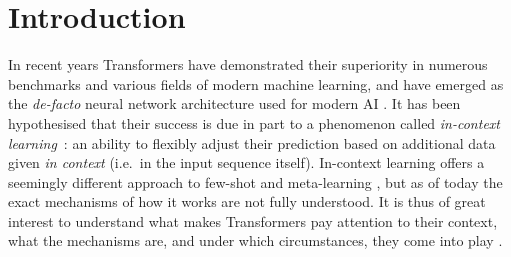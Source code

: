 \documentclass{article}
\theoremstyle{plain}
\theoremstyle{definition}
\theoremstyle{remark}
\begin{document}

\section{Introduction}

In recent years Transformers \citep[TFs;][]{transformers} have demonstrated their superiority in numerous benchmarks and various fields of modern machine learning,
and have emerged as the \textit{de-facto} neural network architecture used for modern AI \citep{transformers_vision, NEURIPS2019_9d63484a, https://doi.org/10.48550/arxiv.2005.12872, convormer}. It has been hypothesised that their success is due in part to a phenomenon called \textit{in-context learning}~\citep{transformers_few_shot,pre_train_prompt}: an ability to flexibly adjust their prediction based on additional data given \emph{in context} (i.e.\ in the input sequence itself). In-context learning offers a seemingly different approach to few-shot and meta-learning \citep{transformers_few_shot}, but as of today the exact mechanisms of how it works are not fully understood.
It is thus of great interest to understand what makes Transformers pay attention to their context, what the mechanisms are, and under which circumstances, they come into play \citep{data_dis_in_context, induction_heads}.
\end{document}
